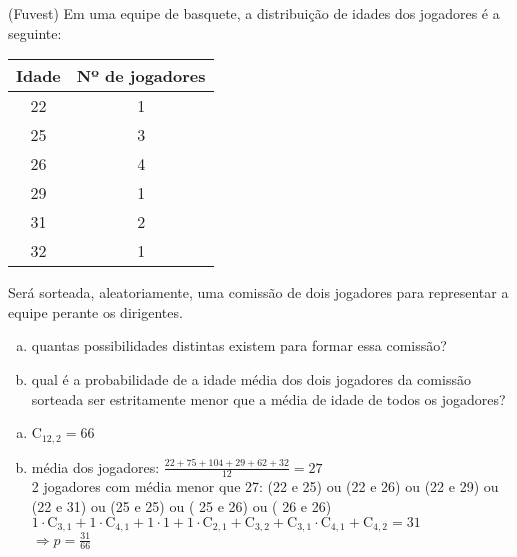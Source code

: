 \begin{ex}
(Fuvest) Em uma equipe de basquete, a distribuição de idades dos jogadores é a seguinte:
\begin{center}
\begin{tabular}{|c|c|} \hline
Idade  & Nº de jogadores \\   \hline
22  &  1  \\  \hline
25  &  3  \\  \hline
26  &  4  \\  \hline
29  &  1  \\  \hline
31  &  2  \\  \hline
32  &  1  \\  \hline
\end{tabular}
\end{center}
Será sorteada, aleatoriamente, uma comissão de dois jogadores para representar a equipe perante os dirigentes.
   \begin{enumerate}[(a)]
   \item quantas possibilidades distintas existem para formar essa comissão?
   \item qual é a probabilidade de a idade média dos dois jogadores da comissão sorteada ser estritamente menor que a média de idade de todos os jogadores?
   \end{enumerate}
     \begin{sol}
      \phantom{A}
      \begin{enumerate} [(a)]
          \item $\mathrm{C}_{{12},2}=66$
          \item média dos jogadores: $\frac{22+75+104+29+62+32}{12}=27$ \\
          2 jogadores com média menor que 27: (22 e 25) ou (22 e 26) ou (22 e 29) ou (22 e 31) ou (25 e 25) ou ( 25 e 26) ou ( 26 e 26)\\
          $1\cdot\mathrm{C}_{3,1}+1\cdot\mathrm{C}_{4,1}+1\cdot1+1\cdot\mathrm{C}_{2,1}+\mathrm{C}_{3,2}+\mathrm{C}_{3,1}\cdot\mathrm{C}_{4,1}+\mathrm{C}_{4,2}=31$\\
          $\Longrightarrow p=\frac{31}{66}$
      \end{enumerate}
     \end{sol}
\end{ex}